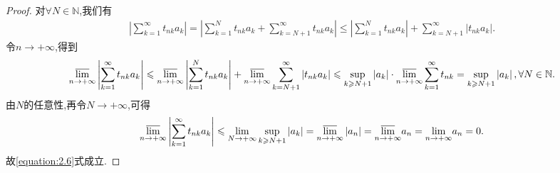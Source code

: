 \documentclass[../../main.tex]{subfiles}%
\begin{document}
\begin{proof}
对$\forall N\in\mathbb{N}$,我们有
\begin{align*}
\left| \sum\limits_{k=1}^{\infty}{t_{nk}a_k} \right|=\left| \sum\limits_{k=1}^N{t_{nk}a_k}+\sum\limits_{k=N+1}^{\infty}{t_{nk}a_k} \right|\leqslant \left| \sum\limits_{k=1}^N{t_{nk}a_k} \right|+\sum\limits_{k=N+1}^{\infty}{\left| t_{nk}a_k \right|}.
\end{align*}
令$n\to+\infty$,得到
\begin{align*}
\underset{n\rightarrow +\infty}{{\varlimsup }}\left| \sum\limits_{k=1}^{\infty}{t_{nk}a_k} \right|\leqslant \underset{n\rightarrow +\infty}{{\varlimsup }}\left| \sum\limits_{k=1}^N{t_{nk}a_k} \right|+\underset{n\rightarrow +\infty}{{\varlimsup }}\sum\limits_{k=N+1}^{\infty}{\left| t_{nk}a_k \right|}\leqslant \mathop {\mathrm{sup}} \limits_{k\geqslant N+1}\left| a_k \right|\cdot \underset{n\rightarrow +\infty}{{\varlimsup }}\sum\limits_{k=1}^{\infty}{t_{nk}}=\mathop {\mathrm{sup}} \limits_{k\geqslant N+1}\left| a_k \right|,\forall N\in \mathbb{N} .
\end{align*}
由$N$的任意性,再令$N\to+\infty$,可得
\begin{align*}
\underset{n\rightarrow +\infty}{{\varlimsup }}\left| \sum\limits_{k=1}^{\infty}{t_{nk}a_k} \right|\leqslant \underset{N\rightarrow +\infty}{\lim}\mathop {\mathrm{sup}} \limits_{k\geqslant N+1}\left| a_k \right|=\underset{n\rightarrow +\infty}{{\varlimsup }}\left| a_n \right|=\underset{n\rightarrow +\infty}{{\varlimsup }}a_n=\underset{n\rightarrow +\infty}{\lim}a_n=0.
\end{align*}
故\eqref{equation:2.6}式成立.
\end{proof}
\end{document}
